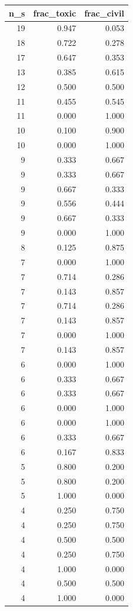 \begin{tabular}{rrr}
\toprule
n_s & frac_toxic & frac_civil \\
\midrule
19 & 0.947 & 0.053 \\
18 & 0.722 & 0.278 \\
17 & 0.647 & 0.353 \\
13 & 0.385 & 0.615 \\
12 & 0.500 & 0.500 \\
11 & 0.455 & 0.545 \\
11 & 0.000 & 1.000 \\
10 & 0.100 & 0.900 \\
10 & 0.000 & 1.000 \\
9 & 0.333 & 0.667 \\
9 & 0.333 & 0.667 \\
9 & 0.667 & 0.333 \\
9 & 0.556 & 0.444 \\
9 & 0.667 & 0.333 \\
9 & 0.000 & 1.000 \\
8 & 0.125 & 0.875 \\
7 & 0.000 & 1.000 \\
7 & 0.714 & 0.286 \\
7 & 0.143 & 0.857 \\
7 & 0.714 & 0.286 \\
7 & 0.143 & 0.857 \\
7 & 0.000 & 1.000 \\
7 & 0.143 & 0.857 \\
6 & 0.000 & 1.000 \\
6 & 0.333 & 0.667 \\
6 & 0.333 & 0.667 \\
6 & 0.000 & 1.000 \\
6 & 0.000 & 1.000 \\
6 & 0.333 & 0.667 \\
6 & 0.167 & 0.833 \\
5 & 0.800 & 0.200 \\
5 & 0.800 & 0.200 \\
5 & 1.000 & 0.000 \\
4 & 0.250 & 0.750 \\
4 & 0.250 & 0.750 \\
4 & 0.500 & 0.500 \\
4 & 0.250 & 0.750 \\
4 & 1.000 & 0.000 \\
4 & 0.500 & 0.500 \\
4 & 1.000 & 0.000 \\

\end{tabular}
